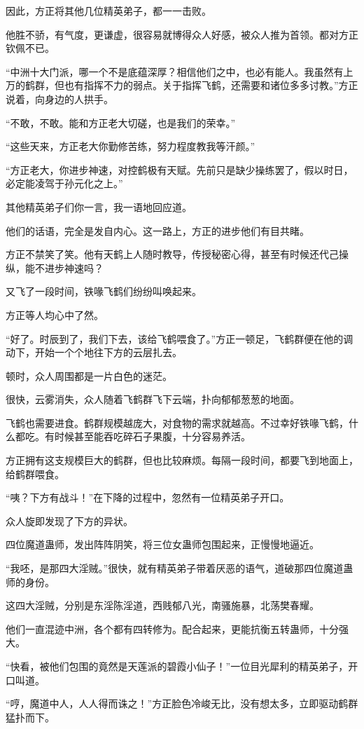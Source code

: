 \begin{this_body}
因此，方正将其他几位精英弟子，都一一击败。

他胜不骄，有气度，更谦虚，很容易就博得众人好感，被众人推为首领。都对方正钦佩不已。

“中洲十大门派，哪一个不是底蕴深厚？相信他们之中，也必有能人。我虽然有上万的鹤群，但也有指挥不力的弱点。关于指挥飞鹤，还需要和诸位多多讨教。”方正说着，向身边的人拱手。

“不敢，不敢。能和方正老大切磋，也是我们的荣幸。”

“这些天来，方正老大你勤修苦练，努力程度教我等汗颜。”

“方正老大，你进步神速，对控鹤极有天赋。先前只是缺少操练罢了，假以时日，必定能凌驾于孙元化之上。”

其他精英弟子们你一言，我一语地回应道。

他们的话语，完全是发自内心。这一路上，方正的进步他们有目共睹。

方正不禁笑了笑。他有天鹤上人随时教导，传授秘密心得，甚至有时候还代己操纵，能不进步神速吗？

又飞了一段时间，铁喙飞鹤们纷纷叫唤起来。

方正等人均心中了然。

“好了。时辰到了，我们下去，该给飞鹤喂食了。”方正一顿足，飞鹤群便在他的调动下，开始一个个地往下方的云层扎去。

顿时，众人周围都是一片白色的迷茫。

很快，云雾消失，众人随着飞鹤群飞下云端，扑向郁郁葱葱的地面。

飞鹤也需要进食。鹤群规模越庞大，对食物的需求就越高。不过幸好铁喙飞鹤，什么都吃。有时候甚至能吞吃碎石子果腹，十分容易养活。

方正拥有这支规模巨大的鹤群，但也比较麻烦。每隔一段时间，都要飞到地面上，给鹤群喂食。

“咦？下方有战斗！”在下降的过程中，忽然有一位精英弟子开口。

众人旋即发现了下方的异状。

四位魔道蛊师，发出阵阵阴笑，将三位女蛊师包围起来，正慢慢地逼近。

“我呸，是那四大淫贼。”很快，就有精英弟子带着厌恶的语气，道破那四位魔道蛊师的身份。

这四大淫贼，分别是东淫陈淫道，西贱郁八光，南骚施暴，北荡樊春耀。

他们一直混迹中洲，各个都有四转修为。配合起来，更能抗衡五转蛊师，十分强大。

“快看，被他们包围的竟然是天莲派的碧霞小仙子！”一位目光犀利的精英弟子，开口叫道。

“哼，魔道中人，人人得而诛之！”方正脸色冷峻无比，没有想太多，立即驱动鹤群猛扑而下。


\end{this_body}
